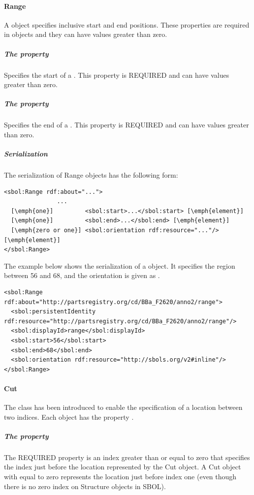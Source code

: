\paragraph{Range}
\label{sec:Range}
A  object specifies inclusive start and end positions. These properties are required in  objects and they can have  values greater than zero.

\subparagraph{The  property}\label{sec:start}
Specifies the start of a . This property is REQUIRED and can have  values greater than zero.

\subparagraph{The  property}\label{sec:end}
Specifies the end of a . This property is REQUIRED and can have  values greater than zero.

\subparagraph{Serialization}

The serialization of Range objects has the following form:
\begin{lstlisting}
<sbol:Range rdf:about="...">
               ...   
  [\emph{one}]         <sbol:start>...</sbol:start> [\emph{element}] 
  [\emph{one}]         <sbol:end>...</sbol:end> [\emph{element}] 
  [\emph{zero or one}] <sbol:orientation rdf:resource="..."/> [\emph{element}] 
</sbol:Range>
\end{lstlisting}

The example below shows the serialization of a  object. It specifies the region between 56 and 68, and the orientation is given as .
\begin{lstlisting}
<sbol:Range rdf:about="http://partsregistry.org/cd/BBa_F2620/anno2/range">
  <sbol:persistentIdentity rdf:resource="http://partsregistry.org/cd/BBa_F2620/anno2/range"/>
  <sbol:displayId>range</sbol:displayId>
  <sbol:start>56</sbol:start>
  <sbol:end>68</sbol:end>
  <sbol:orientation rdf:resource="http://sbols.org/v2#inline"/>
</sbol:Range>
\end{lstlisting}

\paragraph{Cut}
\label{sec:Cut}
The  class has been introduced to enable the specification of a location between two indices. 
Each  object has the property .

\subparagraph{The  property}
\label{sec:at}
The REQUIRED  property is an index greater than or equal to zero that specifies the index just before the location represented by the Cut object. 
A Cut object with  equal to zero represents the location just before index one (even though there is no zero index on Structure objects in SBOL). 

